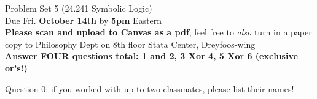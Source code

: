 \documentclass[12pt]{article}
\begin{document}

%
\newcommand{\detritus}[1]{}


\thispagestyle{empty}



\iffalse
\parindent = 0pt
\hspace*{0.0in}\parbox[t]{2.5in}{
Philosophy 24.241\\[3pt]
Symbolic Logic\\[3pt]
Fall, 2022
}
\fi 


\iffalse 
\begin{center}
\Large\bf Problem Set 5 \large{(24.241 Symbolic Logic)}\\[1ex] 
 Due Fri. {\bf{October 14th}} by 5pm Eastern\\[3ex]
\end{center}
\fi

\begin{center}
\Large Problem Set 5 \large{(24.241 Symbolic Logic)} \\[1ex] 
 Due Fri. \textbf{October 14th} by \textbf{5pm} Eastern\\ \normalsize{\textbf{Please scan and upload to Canvas as a pdf}; feel free to \textit{also} turn in a paper copy to Philosophy Dept on 8th floor Stata Center, Dreyfoos-wing} \\[3ex] 
 \textbf{Answer FOUR questions total: 1 and 2, 3 Xor 4, 5 Xor 6 (exclusive or's!)}
\end{center}

Question 0: if you worked with up to two classmates, please list their names! 

\end{document}
